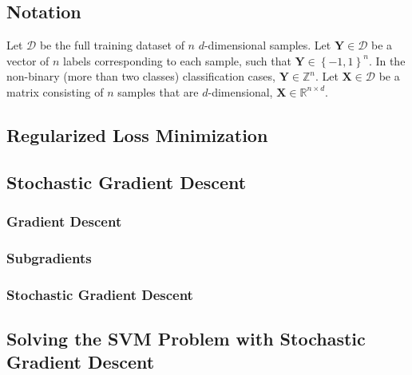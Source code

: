 \documentclass[reqno]{vcuthesis}
\newcommand{\set}[1]{{\left\{#1\right\}}}
\newcommand{\ints}{{\mathbb Z}}
\numberwithin{equation}{chapter}
\begin{document}
\subsection{Notation}\label{subsec:notation}
Let $\mathcal{D}$ be the full training dataset of $n$ $d$-dimensional samples. Let $\bm{Y} \in \mathcal{D}$ be a vector of $n$ labels corresponding to each sample, such that $\bm{Y} \in \set{-1,1}^n$. In the non-binary (more than two classes) classification cases, $\bm Y \in \ints^n$. Let $\bm{X} \in \mathcal{D}$ be a matrix consisting of $n$ samples that are $d$-dimensional, $\bm{X} \in \mathbb{R}^{n \times d}$. 

\subsection{Regularized Loss Minimization}

\subsection{Stochastic Gradient Descent}

\subsubsection{Gradient Descent}

\subsubsection{Subgradients}

\subsubsection{Stochastic Gradient Descent}

\subsection{Solving the SVM Problem with Stochastic Gradient Descent}
\end{document}
